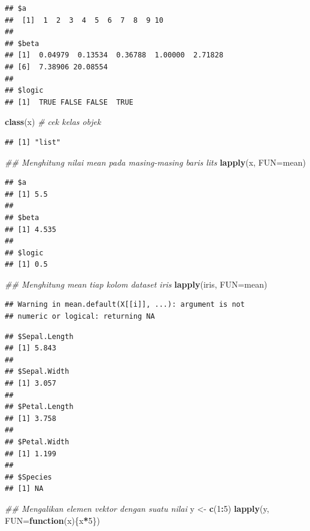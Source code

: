 \documentclass[]{book}
\newenvironment{Shaded}{\begin{snugshade}}{\end{snugshade}}
\newcommand{\CommentTok}[1]{\textcolor[rgb]{0.56,0.35,0.01}{\textit{#1}}}
\newcommand{\ControlFlowTok}[1]{\textcolor[rgb]{0.13,0.29,0.53}{\textbf{#1}}}
\newcommand{\DataTypeTok}[1]{\textcolor[rgb]{0.13,0.29,0.53}{#1}}
\newcommand{\DecValTok}[1]{\textcolor[rgb]{0.00,0.00,0.81}{#1}}
\newcommand{\KeywordTok}[1]{\textcolor[rgb]{0.13,0.29,0.53}{\textbf{#1}}}
\newcommand{\NormalTok}[1]{#1}
\newcommand{\OperatorTok}[1]{\textcolor[rgb]{0.81,0.36,0.00}{\textbf{#1}}}
\newcommand{\StringTok}[1]{\textcolor[rgb]{0.31,0.60,0.02}{#1}}
\theoremstyle{definition}
\theoremstyle{definition}
\theoremstyle{definition}
\theoremstyle{remark}
\begin{document}
\begin{verbatim}
## $a
##  [1]  1  2  3  4  5  6  7  8  9 10
## 
## $beta
## [1]  0.04979  0.13534  0.36788  1.00000  2.71828
## [6]  7.38906 20.08554
## 
## $logic
## [1]  TRUE FALSE FALSE  TRUE
\end{verbatim}

\begin{Shaded}
\begin{Highlighting}[]
\KeywordTok{class}\NormalTok{(x) }\CommentTok{# cek kelas objek}
\end{Highlighting}
\end{Shaded}

\begin{verbatim}
## [1] "list"
\end{verbatim}

\begin{Shaded}
\begin{Highlighting}[]
\CommentTok{## Menghitung nilai mean pada masing-masing baris lits}
\KeywordTok{lapply}\NormalTok{(x, }\DataTypeTok{FUN=}\NormalTok{mean)}
\end{Highlighting}
\end{Shaded}

\begin{verbatim}
## $a
## [1] 5.5
## 
## $beta
## [1] 4.535
## 
## $logic
## [1] 0.5
\end{verbatim}

\begin{Shaded}
\begin{Highlighting}[]
\CommentTok{## Menghitung mean tiap kolom dataset iris}
\KeywordTok{lapply}\NormalTok{(iris, }\DataTypeTok{FUN=}\NormalTok{mean)}
\end{Highlighting}
\end{Shaded}

\begin{verbatim}
## Warning in mean.default(X[[i]], ...): argument is not
## numeric or logical: returning NA
\end{verbatim}

\begin{verbatim}
## $Sepal.Length
## [1] 5.843
## 
## $Sepal.Width
## [1] 3.057
## 
## $Petal.Length
## [1] 3.758
## 
## $Petal.Width
## [1] 1.199
## 
## $Species
## [1] NA
\end{verbatim}

\begin{Shaded}
\begin{Highlighting}[]
\CommentTok{## Mengalikan elemen vektor dengan suatu nilai}
\NormalTok{y <-}\StringTok{ }\KeywordTok{c}\NormalTok{(}\DecValTok{1}\OperatorTok{:}\DecValTok{5}\NormalTok{)}
\KeywordTok{lapply}\NormalTok{(y, }\DataTypeTok{FUN=}\ControlFlowTok{function}\NormalTok{(x)\{x}\OperatorTok{*}\DecValTok{5}\NormalTok{\})}
\end{Highlighting}
\end{Shaded}
\end{document}
